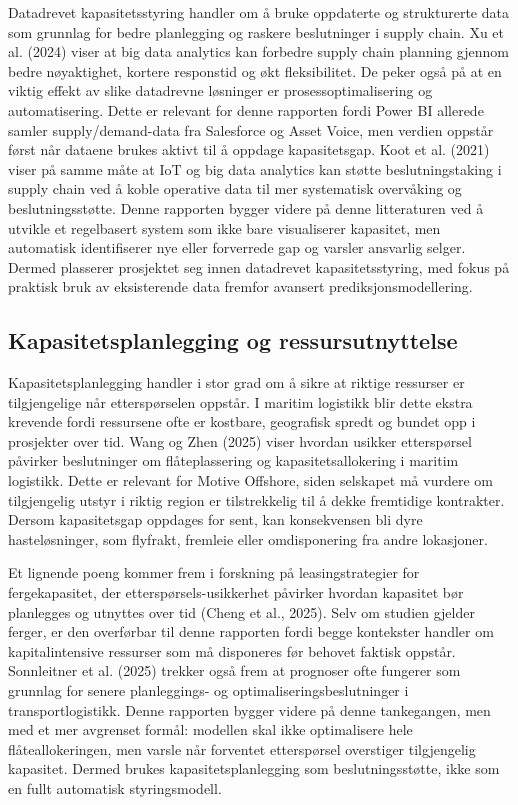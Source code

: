 \documentclass[a4paper,11pt]{article}
\begin{document}
Datadrevet kapasitetsstyring handler om å bruke oppdaterte og strukturerte data som grunnlag for bedre planlegging og raskere beslutninger i supply chain. Xu et al. (2024) viser at big data analytics kan forbedre supply chain planning gjennom bedre nøyaktighet, kortere responstid og økt fleksibilitet. De peker også på at en viktig effekt av slike datadrevne løsninger er prosessoptimalisering og automatisering. Dette er relevant for denne rapporten fordi Power BI allerede samler supply/demand-data fra Salesforce og Asset Voice, men verdien oppstår først når dataene brukes aktivt til å oppdage kapasitetsgap. Koot et al. (2021) viser på samme måte at IoT og big data analytics kan støtte beslutningstaking i supply chain ved å koble operative data til mer systematisk overvåking og beslutningsstøtte. Denne rapporten bygger videre på denne litteraturen ved å utvikle et regelbasert system som ikke bare visualiserer kapasitet, men automatisk identifiserer nye eller forverrede gap og varsler ansvarlig selger. Dermed plasserer prosjektet seg innen datadrevet kapasitetsstyring, med fokus på praktisk bruk av eksisterende data fremfor avansert prediksjonsmodellering. 

\subsection{Kapasitetsplanlegging og ressursutnyttelse}

Kapasitetsplanlegging handler i stor grad om å sikre at riktige ressurser er tilgjengelige når etterspørselen oppstår. I maritim logistikk blir dette ekstra krevende fordi ressursene ofte er kostbare, geografisk spredt og bundet opp i prosjekter over tid. Wang og Zhen (2025) viser hvordan usikker etterspørsel påvirker beslutninger om flåteplassering og kapasitetsallokering i maritim logistikk. Dette er relevant for Motive Offshore, siden selskapet må vurdere om tilgjengelig utstyr i riktig region er tilstrekkelig til å dekke fremtidige kontrakter. Dersom kapasitetsgap oppdages for sent, kan konsekvensen bli dyre hasteløsninger, som flyfrakt, fremleie eller omdisponering fra andre lokasjoner.

Et lignende poeng kommer frem i forskning på leasingstrategier for fergekapasitet, der etterspørsels-usikkerhet påvirker hvordan kapasitet bør planlegges og utnyttes over tid (Cheng et al., 2025). Selv om studien gjelder ferger, er den overførbar til denne rapporten fordi begge kontekster handler om kapitalintensive ressurser som må disponeres før behovet faktisk oppstår. Sonnleitner et al. (2025) trekker også frem at prognoser ofte fungerer som grunnlag for senere planleggings- og optimaliseringsbeslutninger i transportlogistikk. Denne rapporten bygger videre på denne tankegangen, men med et mer avgrenset formål: modellen skal ikke optimalisere hele flåteallokeringen, men varsle når forventet etterspørsel overstiger tilgjengelig kapasitet. Dermed brukes kapasitetsplanlegging som beslutningsstøtte, ikke som en fullt automatisk styringsmodell.
\end{document}
